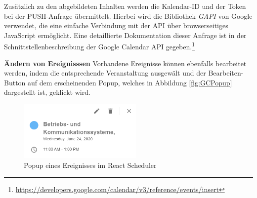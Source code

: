 Zusätzlich zu den abgebildeten Inhalten werden die Kalendar-ID und der Token bei der PUSH-Anfrage übermittelt. Hierbei wird die Bibliothek \textit{GAPI} von Google verwendet, die eine einfache Verbindung mit der \ac{API} über browserseitiges JavaScript ermöglicht. 
Eine detaillierte Dokumentation dieser Anfrage ist in der Schnittstellenbeschreibung der Google Calendar \ac{API} gegeben.\footnote{\url{https://developers.google.com/calendar/v3/reference/events/insert}}

%
%

\textbf{Ändern von Ereignisssen}\newline
Vorhandene Ereignisse können ebenfalls bearbeitet werden, indem die entsprechende Veranstaltung ausgewält und der Bearbeiten-Button auf dem erscheinenden Popup, welches in Abbildung \vref{fig:GCPopup} dargestellt ist, geklickt wird. 
\begin{figure}[H]
	\centering 
	\includegraphics[width=6cm]{img/FrontEnd/GCPopup.png}
	\caption[Popup eines Ereignisses im React Scheduler]{\label{fig:GCPopup}Popup eines Ereignisses im React Scheduler\footnotemark}
\end{figure}

